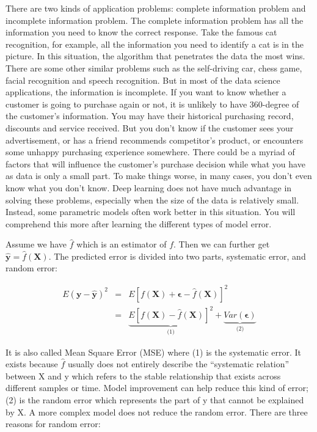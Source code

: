\documentclass[
  12pt,
]{krantz}
\begin{document}
There are two kinds of application problems: complete information problem and incomplete information problem. The complete information problem has all the information you need to know the correct response. Take the famous cat recognition, for example, all the information you need to identify a cat is in the picture. In this situation, the algorithm that penetrates the data the most wins. There are some other similar problems such as the self-driving car, chess game, facial recognition and speech recognition. But in most of the data science applications, the information is incomplete. If you want to know whether a customer is going to purchase again or not, it is unlikely to have 360-degree of the customer's information. You may have their historical purchasing record, discounts and service received. But you don't know if the customer sees your advertisement, or has a friend recommends competitor's product, or encounters some unhappy purchasing experience somewhere. There could be a myriad of factors that will influence the customer's purchase decision while what you have as data is only a small part. To make things worse, in many cases, you don't even know what you don't know. Deep learning does not have much advantage in solving these problems, especially when the size of the data is relatively small. Instead, some parametric models often work better in this situation. You will comprehend this more after learning the different types of model error.

Assume we have \(\hat{f}\) which is an estimator of \(f\). Then we can further get \(\symbf{\hat{y}}=\hat{f}(\mathbf{X})\). The predicted error is divided into two parts, systematic error, and random error:

\begin{equation}
\begin{array}{ccc}
E(\mathbf{y}-\hat{\mathbf{y}})^{2} & = & E[f(\mathbf{X})+ \symbf{\epsilon} - \hat{f}(\mathbf{X})]^{2}\\
 & = & \underset{\text{(1)}}{\underbrace{E[f(\mathbf{X})-\hat{f}(\mathbf{X})]^{2}}}+\underset{\text{(2)}}{\underbrace{Var(\symbf{\epsilon})}}
\end{array}
\label{eq:error}
\end{equation}

It is also called Mean Square Error (MSE) where (1) is the systematic error. It exists because \(\hat{f}\) usually does not entirely describe the ``systematic relation'' between X and y which refers to the stable relationship that exists across different samples or time. Model improvement can help reduce this kind of error; (2) is the random error which represents the part of y that cannot be explained by X. A more complex model does not reduce the random error. There are three reasons for random error:
\end{document}

